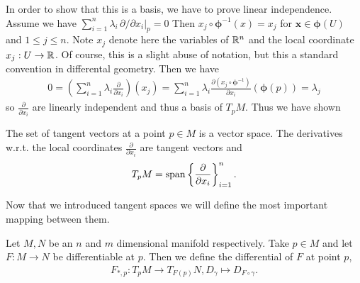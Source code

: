 \documentclass[../master_thesis.tex]{subfiles}
\begin{document}
In order to show that this is a basis, we have to prove linear independence.
Assume we have $\sum_{i=1}^n \lambda_i \, \partial/\partial x_i|_p = 0$
Then $x_j \circ \bm{\phi}^{-1} (x) = x_j$ for $\mathbf{x} \in \bm{\phi}(U)$ and 
$1 \leq j \leq n$. Note $x_j$ denote here the variables of 
$\mathbb{R}^n$ and the local coordinate $x_j:U \rightarrow \mathbb{R}$. Of course, 
this is a slight abuse of notation, but this a standard convention in 
differental geometry.
Then we have 
\begin{align*}
    0 = \left( \sum\limits_{i=1}^n \lambda_i \frac{\partial}{\partial x_i}
        \right) (x_j)
    = \sum\limits_{i=1}^n \lambda_i \frac{\partial (x_j \circ \bm{\phi}^{-1})}{\partial x_i}(\bm{\phi}(p))
    = \lambda_j
\end{align*}
so $\frac{\partial}{\partial x_i}$ are
linearly independent and thus a basis of $T_p M$. Thus we have shown

\begin{proposition}
    The set of tangent vectors at a point $p \in M$ is a vector space. 
    The derivatives w.r.t. the local coordinates $\frac{\partial}{\partial x_i}$ 
    are tangent vectors and 
    \begin{align*}
        T_p M = \operatorname{span} \left\{ \frac{\partial}{\partial x_i} \right\} _{i=1}^n.
    \end{align*}
\end{proposition}

Now that we introduced tangent spaces we will define the most important 
mapping between them.
\begin{definition}[Differential]
    Let $M, N$ be an $n$ and $m$ dimensional manifold respectively. 
    Take $p \in M$ and let $F:M \rightarrow N$ be differentiable at $p$. 
    Then we define the differential of $F$ at point $p$,
    \begin{align*}
        F_{*,p}: T_p M \rightarrow T_{F(p)} N, D_\gamma \mapsto D_{F\circ \gamma}.
    \end{align*}
\end{definition}
\end{document}
